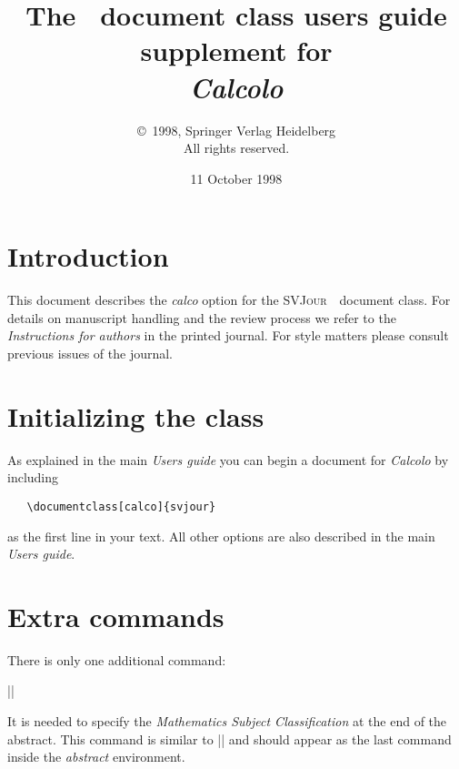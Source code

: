 \documentclass[draft]{ltxguide}[1995/11/28]
\title{The \SJour\ document class users guide\\supplement
for\\\textit{Calcolo}}
\author{\copyright~1998, Springer Verlag Heidelberg\\
   All rights reserved.}
\date{11 October 1998}
\newcommand{\SJour}{\textsc{SVJour}}
\begin{document}
\maketitle

\section{Introduction}
\label{sec:intro}
This document describes the \textit{calco} option for the
\SJour\ \LaTeXe\ document class. For details on
manuscript handling and the review process we refer to the
\emph{Instructions for authors} in the printed journal. For style
matters please consult previous issues of the journal.

\section{Initializing the class}
\label{sec:opt}

As explained in the main \emph{Users guide} you can
begin a document for \emph{Calcolo} by including
\begin{verbatim}
   \documentclass[calco]{svjour}
\end{verbatim}
as the first line in your text. All other options are also described
in the main \emph{Users guide}.

\section{Extra commands}

There is only one additional command:
\begin{decl}
|\subclass|
\end{decl}
It is needed to specify the \emph{Mathematics Subject Classification}
at the end of the abstract. This command is similar to |\keywords| and
should appear as the last command inside the \emph{abstract} environment.
\end{document}

